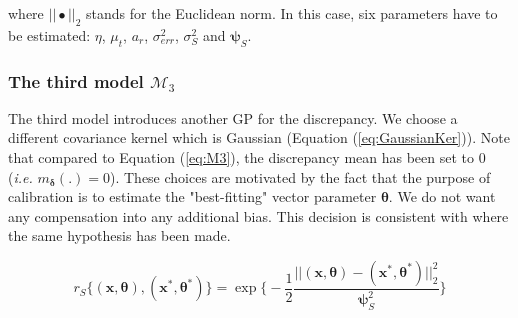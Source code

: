 \documentclass[soumission]{jsfds}
\edef\hc{\string: }
\begin{document}
where $||\bullet||_2$ stands for the Euclidean norm.\newline
In this case, six parameters have to be estimated\hc $\eta$, $\mu_t$, $a_r$, $\sigma_{err}^2$, $\sigma_S^2$ and $\boldsymbol{\psi}_S$. \newline

\subsubsection{The third model $\mathcal{M}_3$}

The third model introduces another GP for the discrepancy. We choose a different covariance kernel which is Gaussian (Equation (\ref{eq:GaussianKer})).
Note that compared to Equation (\ref{eq:M3}), the discrepancy mean has been set to $0$ (\textit{i.e.} $m_{\boldsymbol{\delta}}(.)=0$). These choices are motivated by the fact that the purpose of calibration is to estimate the "best-fitting" 
vector parameter $\boldsymbol{\theta}$. We do not want any compensation into any additional bias. This decision is consistent with \citet{bachoc2014} where the same hypothesis has been made.

\begin{equation}
r_S\{(\boldsymbol{x},\boldsymbol{\theta}),(\boldsymbol{x}^*,\boldsymbol{\theta}^*)\}= \exp\Big\{-\frac{1}{2}\frac{||(\boldsymbol{x},\boldsymbol{\theta})-(\boldsymbol{x}^*,\boldsymbol{\theta}^*)||_2^2}{\boldsymbol{\psi}_S^2}\Big\}
\label{eq:GaussianKer}
\end{equation}


\end{document}
